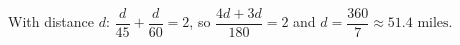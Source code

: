 With distance $d$: $\dfrac d{45}+\dfrac d{60}=2$, so $\dfrac{4d+3d}{180}=2$ and $d=\boxed{\dfrac{360}7\approx51.4\text{ miles}}$.
